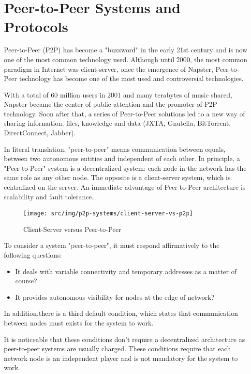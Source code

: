 
\chapter{Peer-to-Peer Systems and Protocols}
\label{chapter:p2p-systems}

Peer-to-Peer (P2P) has become a "buzzword" in the early 21st century and is
now one of the most common technology used. Although until 2000, the most
common paradigm in Internet was client-server, once the emergence of Napster,
Peer-to-Peer technology has become one of the most used and controversial
technologies.

With a total of 60 million users in 2001 and many terabytes of music shared,
Napster became the center of public attention and the promoter of P2P
technology. Soon after that, a series of Peer-to-Peer solutions led to a new
way of sharing information, files, knowledge and data (JXTA, Gnutella,
BitTorrent, DirectConnect, Jabber).

In literal translation, "peer-to-peer" means communication between equals,
between two autonomous entities and independent of each other. In principle,
a "Peer-to-Peer" system is a decentralized system: each node in the network
has the same role as any other node. The opposite is a client-server system,
which is centralized on the server. An immediate advantage of Peer-to-Peer
architecture is scalability and fault tolerance.

\begin{figure}
  \centering
  \texttt{[image: src/img/p2p-systems/client-server-vs-p2p]}
  \caption{Client-Server versus Peer-to-Peer}
  \label{fig:p2p-systems:client-server-vs-p2p}
\end{figure}

To consider a system "peer-to-peer", it must respond affirmatively to the
following questions:
\begin{itemize}
  \item It deals with variable connectivity and temporary addresses as a matter
 of course?
  \item It provides autonomous visibility for nodes at the edge of network?
\end{itemize}

In addition,there is a third default condition, which states that communication
between nodes must exists for the system to work.

It is noticeable that these conditions don't require a decentralized
architecture as peer-to-peer systems are usually charged. These conditions
require that each network node is an independent player and is not mandatory
for the system to work.

